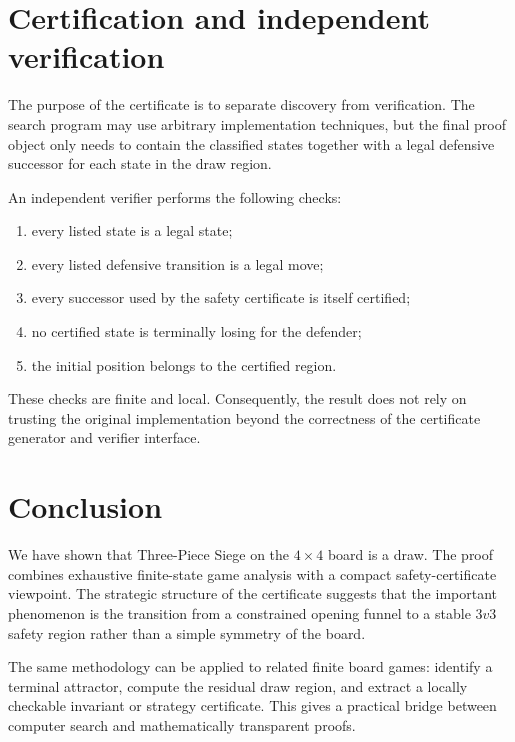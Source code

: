 \documentclass[11pt,a4paper]{article}
\theoremstyle{plain}
\theoremstyle{definition}
\begin{document}
\section{Certification and independent verification}

The purpose of the certificate is to separate discovery from verification. The search program may use arbitrary implementation techniques, but the final proof object only needs to contain the classified states together with a legal defensive successor for each state in the draw region.

An independent verifier performs the following checks:
\begin{enumerate}[label=(\arabic*)]
  \item every listed state is a legal state;
  \item every listed defensive transition is a legal move;
  \item every successor used by the safety certificate is itself certified;
  \item no certified state is terminally losing for the defender;
  \item the initial position belongs to the certified region.
\end{enumerate}

These checks are finite and local. Consequently, the result does not rely on trusting the original implementation beyond the correctness of the certificate generator and verifier interface.

\section{Conclusion}

We have shown that Three-Piece Siege on the $4\times4$ board is a draw. The proof combines exhaustive finite-state game analysis with a compact safety-certificate viewpoint. The strategic structure of the certificate suggests that the important phenomenon is the transition from a constrained opening funnel to a stable $3v3$ safety region rather than a simple symmetry of the board.

The same methodology can be applied to related finite board games: identify a terminal attractor, compute the residual draw region, and extract a locally checkable invariant or strategy certificate. This gives a practical bridge between computer search and mathematically transparent proofs.
\end{document}
